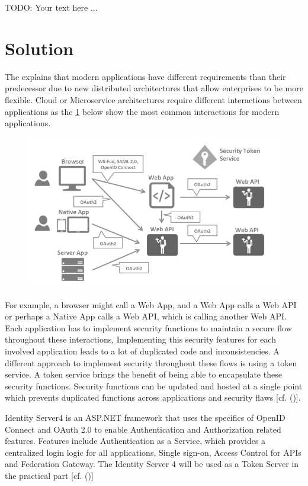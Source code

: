  

TODO: Your text here ...


\section{Solution}
The \cite{Sakimura:2014:OpenIDConnect} explains that modern applications have different requirements than their predecessor due to new distributed architectures that allow enterprises to be more flexible. Cloud or Microservice architectures require different interactions between applications as the \ref{fig:architecture-identityserver} below show the most common interactions for modern applications.

\begin{figure}[h]
	\centering
	\includegraphics[width=0.9\linewidth]{images/architecture-identityserver}
	\caption[Architecture IdentityServer4]{}
	\caption{}
	\label{fig:architecture-identityserver}
\end{figure}



For example, a browser might call a Web App, and a Web App calls a Web API or perhaps a Native App calls a Web API, which is calling another Web API. Each application has to implement security functions to maintain a secure flow throughout these interactions, Implementing this security features for each involved application leads to a lot of duplicated code and inconsistencies. A different approach to implement security throughout these flows is using a token service. A token service brings the benefit of being able to encapsulate these security functions. Security functions can be updated and hosted at a single point which prevents duplicated functions across applications and security flaws [cf. (\cite{Sakimura:2014:OpenIDConnect})].

Identity Server4 is an ASP.NET framework that uses the specifics of OpenID Connect and OAuth 2.0 to enable Authentication and Authorization related features. Features include Authentication as a Service, which provides a centralized login logic for all applications, Single sign-on, Access Control for APIs and Federation Gateway. The Identity Server 4 will be used as a Token Server in the practical part [cf. (\cite{Brock:2018:ID4})]

